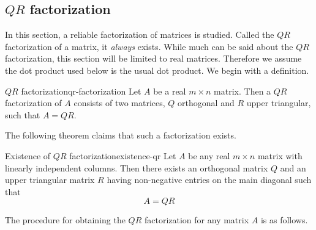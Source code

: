 \subsection{$QR$ factorization}

In this section, a reliable factorization of matrices is studied. Called the $QR$ factorization of a matrix, it \textit{always} exists. While much can be said about the $QR$ factorization, this section will be limited to real matrices. Therefore we assume the dot product used below is the usual dot product. We begin with a definition. 

\begin{definition}{$QR$ factorization}{qr-factorization}
Let $A$ be a real $m\times n$ matrix. Then a $QR$ factorization of $A$ consists
of two matrices, $Q$ orthogonal and $R$ upper
triangular, such that $A=QR$. 
\end{definition}

The following theorem claims that such a factorization exists. 

\begin{theorem}{Existence of $QR$ factorization}{existence-qr}
Let $A$ be any real $m\times n$ matrix with linearly independent columns. Then there exists an orthogonal
matrix $Q$ and an upper triangular matrix $R$ having non-negative entries
on the main diagonal such that
\begin{equation*}
A=QR
\end{equation*}
\end{theorem}

The procedure for obtaining the $QR$ factorization for any matrix $A$ is as follows.

